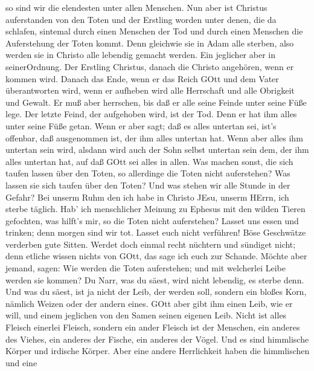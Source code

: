 so sind wir die elendesten unter allen Menschen.  Nun aber
ist Christus auferstanden von den Toten und der Erstling worden unter
denen, die da schlafen,  sintemal durch einen Menschen der
Tod und durch einen Menschen die Auferstehung der Toten kommt.
 Denn gleichwie sie in Adam alle sterben, also werden sie
in Christo alle lebendig gemacht werden.  Ein jeglicher
aber in seinerOrdnung. Der Erstling Christus, danach die Christo
angehören, wenn er kommen wird.  Danach das Ende, wenn er
das Reich GOtt und dem Vater überantworten wird, wenn er aufheben wird
alle Herrschaft und alle Obrigkeit und Gewalt.  Er muß aber
herrschen, bis daß er alle seine Feinde unter seine Füße lege.
 Der letzte Feind, der aufgehoben wird, ist der Tod.
 Denn er hat ihm alles unter seine Füße getan. Wenn er aber
sagt; daß es alles untertan sei, ist's offenbar, daß ausgenommen ist,
der ihm alles untertan hat.  Wenn aber alles ihm untertan
sein wird, alsdann wird auch der Sohn selbst untertan sein dem, der ihm
alles untertan hat, auf daß GOtt sei alles in allen.  Was
machen sonst, die sich taufen lassen über den Toten, so allerdinge die
Toten nicht auferstehen? Was lassen sie sich taufen über den Toten?
 Und was stehen wir alle Stunde in der Gefahr?
 Bei unserm Ruhm den ich habe in Christo JEsu, unserm
HErrn, ich sterbe täglich.  Hab' ich menschlicher Meinung
zu Ephesus mit den wilden Tieren gefochten, was hilft's mir, so die
Toten nicht auferstehen? Lasset uns essen und trinken; denn morgen sind
wir tot.  Lasset euch nicht verführen! Böse Geschwätze
verderben gute Sitten.  Werdet doch einmal recht nüchtern
und sündiget nicht; denn etliche wissen nichts von GOtt, das sage ich
euch zur Schande.  Möchte aber jemand, sagen: Wie werden
die Toten auferstehen; und mit welcherlei Leibe werden sie kommen?
 Du Narr, was du säest, wird nicht lebendig, es sterbe
denn.  Und was du säest, ist ja nicht der Leib, der werden
soll, sondern ein bloßes Korn, nämlich Weizen oder der andern eines.
 GOtt aber gibt ihm einen Leib, wie er will, und einem
jeglichen von den Samen seinen eigenen Leib.  Nicht ist
alles Fleisch einerlei Fleisch, sondern ein ander Fleisch ist der
Menschen, ein anderes des Viehes, ein anderes der Fische, ein anderes
der Vögel.  Und es sind himmlische Körper und irdische
Körper. Aber eine andere Herrlichkeit haben die himmlischen und eine
